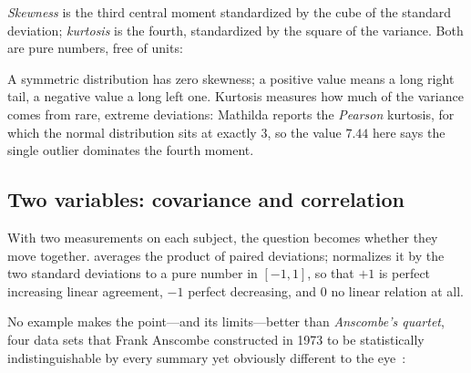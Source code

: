 \emph{Skewness} is the third central moment standardized by the cube of the
standard deviation; \emph{kurtosis} is the fourth, standardized by the square of
the variance. Both are pure numbers, free of units:

\begin{codepairs}
\end{codepairs}

A symmetric distribution has zero skewness; a positive value means a long right
tail, a negative value a long left one. Kurtosis measures how much of the variance
comes from rare, extreme deviations: Mathilda reports the \emph{Pearson} kurtosis,
for which the normal distribution sits at exactly \(3\), so the value \(7.44\) here
says the single outlier dominates the fourth moment.


\subsection{Two variables: covariance and correlation}
\label{ssec:stat-correlation}

With two measurements on each subject, the question becomes whether they move
together.  averages the product of paired deviations; 
normalizes it by the two standard deviations to a pure number in \([-1, 1]\), so
that \(+1\) is perfect increasing linear agreement, \(-1\) perfect decreasing, and
\(0\) no linear relation at all.

No example makes the point---and its limits---better than \emph{Anscombe's
quartet}, four data sets that Frank Anscombe constructed
in 1973 to be statistically indistinguishable by every summary yet obviously
different to the eye~\cite{anscombe1973}:

